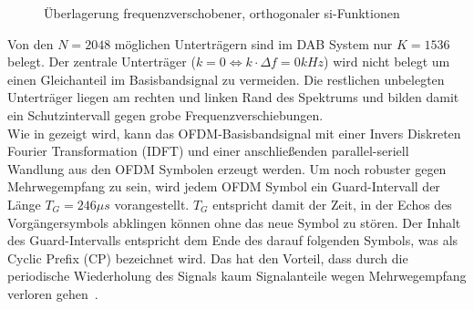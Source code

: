\begin{figure}
\begin{center}
\end{center}
\caption{Überlagerung frequenzverschobener, orthogonaler si-Funktionen}
\label{fig:OFDM}
\end{figure}

Von den $N = 2048$ möglichen Unterträgern sind im DAB System nur $K = 1536$ belegt. Der zentrale Unterträger ($k=0 \Leftrightarrow k\cdot \Delta f = 0kHz$) wird nicht belegt um einen Gleichanteil im Basisbandsignal zu vermeiden. Die restlichen unbelegten Unterträger liegen am rechten und linken Rand des Spektrums und bilden damit ein Schutzintervall gegen grobe Frequenzverschiebungen.\\
Wie in \cite{ofdm:idft} gezeigt wird, kann das OFDM-Basisbandsignal mit einer Invers Diskreten Fourier Transformation (IDFT) und einer anschließenden parallel-seriell Wandlung aus den OFDM Symbolen erzeugt werden. Um noch robuster gegen Mehrwegempfang zu sein, wird jedem OFDM Symbol ein Guard-Intervall der Länge $T_G=246\mu s$ vorangestellt. $T_G$ entspricht damit der Zeit, in der Echos des Vorgängersymbols abklingen können ohne das neue Symbol zu stören. Der Inhalt des Guard-Intervalls entspricht dem Ende des darauf folgenden Symbols, was als Cyclic Prefix (CP) bezeichnet wird. Das hat den Vorteil, dass durch die periodische Wiederholung des Signals kaum Signalanteile wegen Mehrwegempfang verloren gehen~\cite{nt1}.

